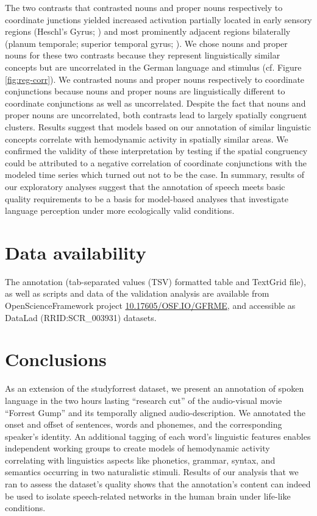 \documentclass[10pt,a4paper,onecolumn]{article}
\begin{document}
The two contrasts that contrasted nouns and proper nouns respectively to
coordinate junctions yielded increased activation partially located in early
sensory regions (Heschl's Gyrus; \citep{saenz2014tonotopic}) and most
prominently adjacent regions bilaterally (planum temporale; superior temporal
gyrus; \citep{arsenault2015distributed, mesgarani2014phonetic}).
We chose nouns and proper nouns for these two contrasts because they represent
linguistically similar concepts but are uncorrelated in the German language
and stimulus (cf. Figure \ref{fig:reg-corr}).
We contrasted nouns and proper nouns respectively to coordinate conjunctions
because nouns and proper nouns are linguistically different to coordinate
conjunctions as well as uncorrelated.
Despite the fact that
nouns and proper nouns are uncorrelated, both contrasts lead to largely
spatially congruent clusters. Results suggest that models based on our
annotation of similar linguistic concepts correlate with hemodynamic activity in
spatially similar areas.
We confirmed the validity of these interpretation by testing if the spatial
congruency could be attributed to a negative correlation of coordinate
conjunctions with the modeled time series which turned out not to be the case.
In summary, results of our exploratory analyses suggest that the annotation of
speech meets basic quality requirements to be a basis for model-based
analyses that investigate language perception under more ecologically valid
conditions.


\section*{Data availability}

The annotation (tab-separated values (TSV) formatted table and TextGrid file),
as well as scripts and data of the validation analysis are available from
OpenScienceFramework project
\href{http://dx.doi.org/10.17605/OSF.IO/GFRME}{10.17605/OSF.IO/GFRME}, and
accessible as DataLad (RRID:SCR\_003931) datasets.


\section*{Conclusions}
As an extension of the studyforrest dataset, we present an annotation of spoken
language in the two hours lasting ``research cut'' of the audio-visual movie
``Forrest Gump'' and its temporally aligned audio-description.
We annotated the onset and offset of sentences, words and phonemes, and the
corresponding speaker's identity.
An additional tagging of each word's linguistic features enables independent
working groups to create models of hemodynamic activity
correlating with linguistics aspects like phonetics, grammar, syntax, and
semantics occurring in two naturalistic stimuli.
Results of our analysis that we ran to assess the dataset's quality shows that
the annotation's content can indeed be used to isolate speech-related networks
in the human brain under life-like conditions.
\end{document}
